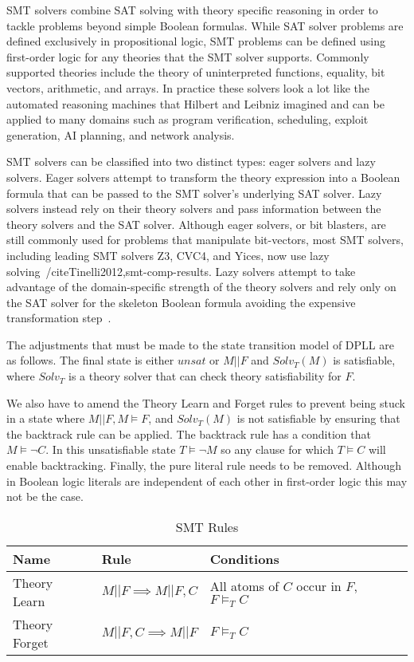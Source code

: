 \documentclass[]{final_report}
\begin{document}
SMT solvers combine SAT solving with theory specific reasoning in order to tackle problems beyond simple Boolean formulas. While SAT solver problems are defined exclusively in propositional logic, SMT problems can be defined using first-order logic for any theories that the SMT solver supports. Commonly supported theories include the theory of uninterpreted functions, equality, bit vectors, arithmetic, and arrays. In practice these solvers look a lot like the automated reasoning machines that Hilbert and Leibniz imagined and can be applied to many domains such as program verification, scheduling, exploit generation, AI planning, and network analysis.

SMT solvers can be classified into two distinct types: eager solvers and lazy solvers. Eager solvers attempt to transform the theory expression into a Boolean formula that can be passed to the SMT solver's underlying SAT solver. Lazy solvers instead rely on their theory solvers and pass information between the theory solvers and the SAT solver. Although eager solvers, or bit blasters, are still commonly used for problems that manipulate bit-vectors, most SMT solvers, including leading SMT solvers Z3, CVC4, and Yices, now use lazy solving~/cite{Tinelli2012,smt-comp-results}. Lazy solvers attempt to take advantage of the domain-specific strength of the theory solvers and rely only on the SAT solver for the skeleton Boolean formula avoiding the expensive transformation step~\cite{sattosmt, smtdpplt}.

The adjustments that must be made to the state transition model of DPLL are as follows. The final state is either $unsat$ or $M || F$ and $Solv _T(M)$ is satisfiable, where $Solv_T$ is a theory solver that can check theory satisfiability for $F$.

We also have to amend the Theory Learn and Forget rules to prevent being stuck in a state where $M || F, M \models F$, and $Solv_T(M)$ is not satisfiable by ensuring that the backtrack rule can be applied. The backtrack rule has a condition that $M \models \lnot C$. In this unsatisfiable state $T \models \lnot{M}$ so any clause for which $T \models C$ will enable backtracking. Finally, the pure literal rule needs to be removed. Although in Boolean logic literals are independent of each other in first-order logic this may not be the case.

\begin{table}[t]
\centering
\label{smt-rulesl}
\begin{tabular}{|p{2cm}|p{3cm}|p{6cm}|p{9cm}|}
\hline
Name & Rule & Conditions \\ \hline
Theory Learn & $M || F \implies M|| F, C $ & All atoms of $C$ occur in $F$, $F \models _T C $ \\ \hline
Theory Forget & $M || F, C \implies M || F $ & $F \models _T C$ \\ \hline
\end{tabular}
\caption{SMT Rules}
\end{table}
\end{document}
